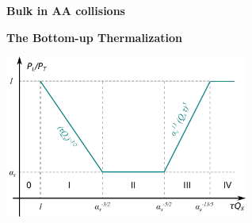 \documentclass[9pt,a4paper,unknownkeysallowed,xcolor=dvipsnames,aspectratio=43]{beamer}
\begin{document}
%
\setcounter{page}{0}
\begin{frame}
\vspace*{\fill}
\begin{center}
{\Huge\bf\color{gray} Bulk in AA collisions}
\end{center}
\vspace*{\fill}
\end{frame}
%
%
\setcounter{page}{6}
\begin{frame}{\bf\huge The Bottom-up Thermalization}	\vspace{2mm}
\begin{center}
\includegraphics[width=0.6\textwidth]{fig/PLoPT}\\
\vspace{4mm}

\end{center}
\end{frame}
\end{document}

